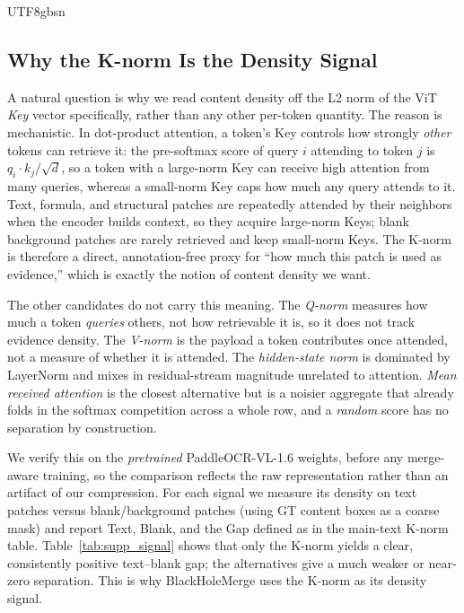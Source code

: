 \documentclass[10pt,twocolumn,letterpaper]{article}
\newcommand{\ours}{BlackHoleMerge}
\begin{document}
\begin{CJK}{UTF8}{gbsn}
\subsection{Why the K-norm Is the Density Signal}
A natural question is why we read content density off the L2 norm of the ViT \emph{Key}
vector specifically, rather than any other per-token quantity. The reason is mechanistic. In
dot-product attention, a token's Key controls how strongly \emph{other} tokens can retrieve
it: the pre-softmax score of query $i$ attending to token $j$ is $q_i\!\cdot\!k_j/\sqrt{d}$,
so a token with a large-norm Key can receive high attention from many queries, whereas a
small-norm Key caps how much any query attends to it. Text, formula, and structural patches
are repeatedly attended by their neighbors when the encoder builds context, so they acquire
large-norm Keys; blank background patches are rarely retrieved and keep small-norm Keys. The
K-norm is therefore a direct, annotation-free proxy for ``how much this patch is used as
evidence,'' which is exactly the notion of content density we want.

The other candidates do not carry this meaning. The \emph{Q-norm} measures how much a token
\emph{queries} others, not how retrievable it is, so it does not track evidence density. The
\emph{V-norm} is the payload a token contributes once attended, not a measure of whether it
is attended. The \emph{hidden-state norm} is dominated by LayerNorm and mixes in
residual-stream magnitude unrelated to attention. \emph{Mean received attention} is the
closest alternative but is a noisier aggregate that already folds in the softmax competition
across a whole row, and a \emph{random} score has no separation by construction.

We verify this on the \emph{pretrained} PaddleOCR-VL-1.6 weights, before any merge-aware
training, so the comparison reflects the raw representation rather than an artifact of our
compression. For each signal we measure its density on text patches versus blank/background
patches (using GT content boxes as a coarse mask) and report Text, Blank, and the Gap defined
as in the main-text K-norm table. Table~\ref{tab:supp_signal} shows that only the K-norm
yields a clear, consistently positive text--blank gap; the alternatives give a much weaker or
near-zero separation. This is why \ours{} uses the K-norm as its density signal.


\end{CJK}
\end{document}
